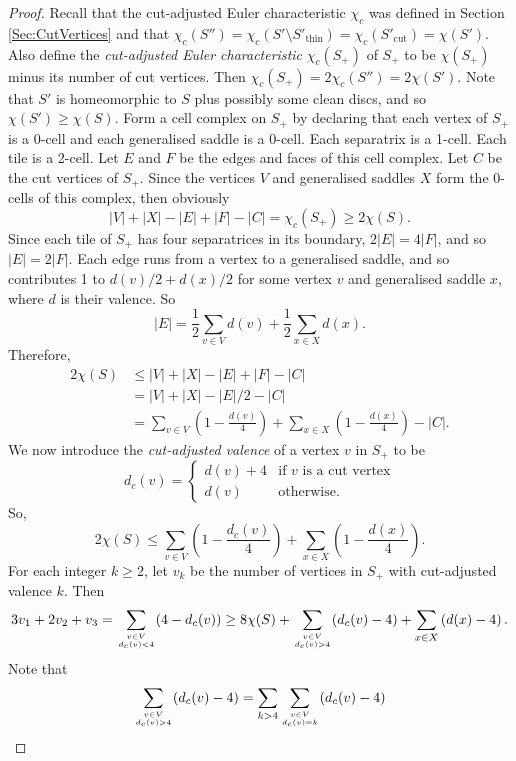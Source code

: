 \documentclass[oneside]{amsart}
\numberwithin{equation}{section}
\theoremstyle{plain}
\theoremstyle{definition}
\begin{document}
\begin{proof}
Recall that the cut-adjusted Euler characteristic $\chi_c$ was defined in Section \ref{Sec:CutVertices}
and that $\chi_c(S'') = \chi_c(S' \setminus S'_{\mathrm{thin}}) = \chi_c(S'_\mathrm{cut}) = \chi(S')$. Also define the \emph{cut-adjusted Euler characteristic} $\chi_c(S_+)$
of $S_+$ to be $\chi(S_+)$ minus its number of cut vertices. Then $\chi_c(S_+) = 2\chi_c(S'') = 2\chi(S')$.
Note that $S'$ is homeomorphic to $S$ plus possibly some clean discs, and so $\chi(S') \geq \chi(S)$.
Form a cell complex on $S_+$ by declaring that each vertex of $S_+$ is a 0-cell and each
generalised saddle is a 0-cell. Each separatrix is a 1-cell. Each tile is a 2-cell.
Let $E$ and $F$ be the edges and faces of this cell complex. Let $C$ be the cut vertices
of $S_+$. Since the vertices $V$ and generalised saddles $X$
form the 0-cells of this complex, then obviously
$$|V| + |X| - |E| + |F| - |C|= \chi_c(S_+) \geq 2 \chi(S).$$
Since each tile of $S_+$ has four separatrices in its boundary, $2|E| = 4|F|$, and so $|E| = 2 |F|$.
Each edge runs from a vertex to a generalised saddle, and so contributes 1 to $d(v)/2 + d(x)/2$ 
for some vertex $v$ and generalised saddle $x$, where $d$ is their valence.
So
$$|E| = \frac{1}{2} \sum_{v \in V} d(v) + \frac{1}{2} \sum_{x \in X} d(x).$$
Therefore, 
\begin{align*}
2 \chi(S) & \leq |V| + |X| - |E| + |F| - |C| \\
&= |V| + |X| - |E|/2 - |C| \\
& = \sum_{v \in V} \left (1 - \frac{d(v)}{4} \right ) + 
\sum_{x \in X} \left (1 - \frac{d(x)}{4}\right) - |C|.
\end{align*}
We now introduce the \emph{cut-adjusted valence} of a vertex $v$ in $S_+$ to be
$$d_c(v) = 
\begin{cases}
d(v) + 4 & \text{if } v \text{ is a cut vertex} \\
d(v) & \text{otherwise}.
\end{cases}
$$
So,
$$2 \chi(S) \leq \sum_{v \in V} \left (1 - \frac{d_c(v)}{4} \right ) + 
\sum_{x \in X} \left (1 - \frac{d(x)}{4}\right).$$
For each integer $k \geq 2$, let $v_k$ be the number of vertices in $S_+$ with cut-adjusted valence $k$. Then
$$3v_1 + 2 v_2 + v_3 =
\sum_{\scriptstyle{v \in V \atop d_c(v) < 4}} (4 - d_c(v)) \geq
8\chi(S) + \sum_{\scriptstyle{v \in V \atop d_c(v) > 4}} (d_c(v) - 4) + 
\sum_{x \in X} \left (d(x) - 4 \right).$$
Note that
$$\sum_{\scriptstyle{v \in V \atop  d_c(v) > 4}} (d_c(v) - 4) = 
\sum_{k > 4} \sum_{\scriptstyle{v \in V \atop d_c(v) = k}} (d_c(v) - 4)
$$
\end{proof}
\end{document}
